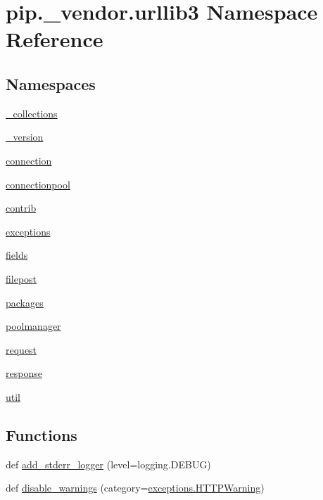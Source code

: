 \hypertarget{namespacepip_1_1__vendor_1_1urllib3}{}\section{pip.\+\_\+vendor.\+urllib3 Namespace Reference}
\label{namespacepip_1_1__vendor_1_1urllib3}
\subsection*{Namespaces}
\begin{DoxyCompactItemize}
\item 
 \hyperlink{namespacepip_1_1__vendor_1_1urllib3_1_1__collections}{\+\_\+collections}
\item 
 \hyperlink{namespacepip_1_1__vendor_1_1urllib3_1_1__version}{\+\_\+version}
\item 
 \hyperlink{namespacepip_1_1__vendor_1_1urllib3_1_1connection}{connection}
\item 
 \hyperlink{namespacepip_1_1__vendor_1_1urllib3_1_1connectionpool}{connectionpool}
\item 
 \hyperlink{namespacepip_1_1__vendor_1_1urllib3_1_1contrib}{contrib}
\item 
 \hyperlink{namespacepip_1_1__vendor_1_1urllib3_1_1exceptions}{exceptions}
\item 
 \hyperlink{namespacepip_1_1__vendor_1_1urllib3_1_1fields}{fields}
\item 
 \hyperlink{namespacepip_1_1__vendor_1_1urllib3_1_1filepost}{filepost}
\item 
 \hyperlink{namespacepip_1_1__vendor_1_1urllib3_1_1packages}{packages}
\item 
 \hyperlink{namespacepip_1_1__vendor_1_1urllib3_1_1poolmanager}{poolmanager}
\item 
 \hyperlink{namespacepip_1_1__vendor_1_1urllib3_1_1request}{request}
\item 
 \hyperlink{namespacepip_1_1__vendor_1_1urllib3_1_1response}{response}
\item 
 \hyperlink{namespacepip_1_1__vendor_1_1urllib3_1_1util}{util}
\end{DoxyCompactItemize}
\subsection*{Functions}
\begin{DoxyCompactItemize}
\item 
def \hyperlink{namespacepip_1_1__vendor_1_1urllib3_a7fab237b204028b828a2bf9e72d152fa}{add\+\_\+stderr\+\_\+logger} (level=logging.\+D\+E\+B\+UG)
\item 
def \hyperlink{namespacepip_1_1__vendor_1_1urllib3_ab99d0d079c455e80beb203e0e048d2d6}{disable\+\_\+warnings} (category=\hyperlink{classpip_1_1__vendor_1_1urllib3_1_1exceptions_1_1HTTPWarning}{exceptions.\+H\+T\+T\+P\+Warning})
\end{DoxyCompactItemize}
